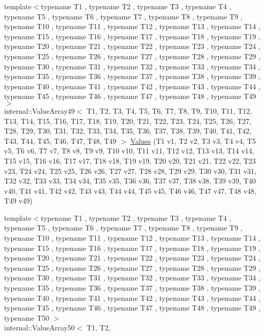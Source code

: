 \begin{DoxyCompactItemize}
\item 
{\footnotesize template$<$typename T1 , typename T2 , typename T3 , typename T4 , typename T5 , typename T6 , typename T7 , typename T8 , typename T9 , typename T10 , typename T11 , typename T12 , typename T13 , typename T14 , typename T15 , typename T16 , typename T17 , typename T18 , typename T19 , typename T20 , typename T21 , typename T22 , typename T23 , typename T24 , typename T25 , typename T26 , typename T27 , typename T28 , typename T29 , typename T30 , typename T31 , typename T32 , typename T33 , typename T34 , typename T35 , typename T36 , typename T37 , typename T38 , typename T39 , typename T40 , typename T41 , typename T42 , typename T43 , typename T44 , typename T45 , typename T46 , typename T47 , typename T48 , typename T49 $>$ }\\internal\-::\-Value\-Array49$<$ \-T1, \-T2, \*
\-T3, \-T4, \-T5, \-T6, \-T7, \-T8, \-T9, \*
\-T10, \-T11, \-T12, \-T13, \-T14, \-T15, \*
\-T16, \-T17, \-T18, \-T19, \-T20, \-T21, \*
\-T22, \-T23, \-T24, \-T25, \-T26, \-T27, \*
\-T28, \-T29, \-T30, \-T31, \-T32, \-T33, \*
\-T34, \-T35, \-T36, \-T37, \-T38, \-T39, \*
\-T40, \-T41, \-T42, \-T43, \-T44, \-T45, \*
\-T46, \-T47, \-T48, \-T49 $>$ \hyperlink{namespacetesting_a034785cd0f04e5f5ec9e16c1cad5ccde}{\-Values} (\-T1 v1, \-T2 v2, \-T3 v3, \-T4 v4, \-T5 v5, \-T6 v6, \-T7 v7, \-T8 v8, \-T9 v9, \-T10 v10, \-T11 v11, \-T12 v12, \-T13 v13, \-T14 v14, \-T15 v15, \-T16 v16, \-T17 v17, \-T18 v18, \-T19 v19, \-T20 v20, \-T21 v21, \-T22 v22, \-T23 v23, \-T24 v24, \-T25 v25, \-T26 v26, \-T27 v27, \-T28 v28, \-T29 v29, \-T30 v30, \-T31 v31, \-T32 v32, \-T33 v33, \-T34 v34, \-T35 v35, \-T36 v36, \-T37 v37, \-T38 v38, \-T39 v39, \-T40 v40, \-T41 v41, \-T42 v42, \-T43 v43, \-T44 v44, \-T45 v45, \-T46 v46, \-T47 v47, \-T48 v48, \-T49 v49)
\item 
{\footnotesize template$<$typename T1 , typename T2 , typename T3 , typename T4 , typename T5 , typename T6 , typename T7 , typename T8 , typename T9 , typename T10 , typename T11 , typename T12 , typename T13 , typename T14 , typename T15 , typename T16 , typename T17 , typename T18 , typename T19 , typename T20 , typename T21 , typename T22 , typename T23 , typename T24 , typename T25 , typename T26 , typename T27 , typename T28 , typename T29 , typename T30 , typename T31 , typename T32 , typename T33 , typename T34 , typename T35 , typename T36 , typename T37 , typename T38 , typename T39 , typename T40 , typename T41 , typename T42 , typename T43 , typename T44 , typename T45 , typename T46 , typename T47 , typename T48 , typename T49 , typename T50 $>$ }\\internal\-::\-Value\-Array50$<$ \-T1, \-T2, \*

\end{DoxyCompactItemize}
